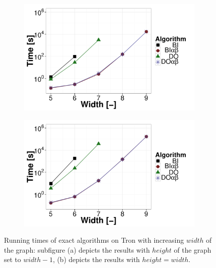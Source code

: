 \begin{figure}[t!]
\centering
	\begin{subfigure}{0.49\textwidth}
		\includegraphics[width=1\textwidth]{figures/Tron-1.pdf}\caption{}\label{fig:off:res:tron1}
	\end{subfigure}
	\begin{subfigure}{0.49\textwidth}
		\includegraphics[width=1\textwidth]{figures/Tron-2.pdf}\caption{}\label{fig:off:res:tron2}
	\end{subfigure}
\caption{Running times of exact algorithms on Tron with increasing $width$ of the graph: subfigure (a) depicts the results with $height$ of the graph set to $width - 1$, (b) depicts the results with $height = width$.} \label{fig:off:res:tron}
\end{figure}


